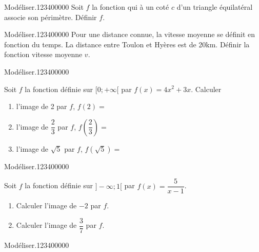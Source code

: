 \begin{pageAD}  %
\restoregeometry %


\begin{ExoCad}{Modéliser.}{1234}{0}{0}{0}{0}{0}
Soit $f$ la fonction qui à un coté $c$ d'un triangle équilatéral associe son périmètre. Définir $f$. 
\end{ExoCad} 


\begin{ExoCad}{Modéliser.}{1234}{0}{0}{0}{0}{0}
Pour une distance connue, la vitesse moyenne se définit en fonction du temps. La distance entre Toulon et Hyères est de 20km. Définir la fonction vitesse moyenne $v$. 
\end{ExoCad} 


\begin{ExoCad}{Modéliser.}{1234}{0}{0}{0}{0}{0}

Soit $f$ la fonction définie sur $[0;+\infty[$ par $f(x)= 4x^2+3x$. Calculer

\begin{enumerate}
\item l'image de 2 par $f$, $f(2)=$
\item l'image de $\dfrac{2}{3}$ par $f$, $f\left(\dfrac{2}{3}\right)=$
\item l'image de $\sqrt{5}$ par $f$, $f\left(\sqrt{5}\right)=$
\end{enumerate}
\end{ExoCad} 

 

\begin{ExoCad}{Modéliser.}{1234}{0}{0}{0}{0}{0}

Soit $f$ la fonction définie sur $]-\infty;1[$ par $f(x)= \dfrac{5}{x-1}$. 

\begin{enumerate}
\item Calculer l'image de $-2$ par $f$.  

\item Calculer l'image de $\dfrac{3}{7}$ par $f$. 

\end{enumerate}
\end{ExoCad}


 

\begin{ExoCad}{Modéliser.}{1234}{0}{0}{0}{0}{0}


\end{ExoCad}
\end{pageAD}
